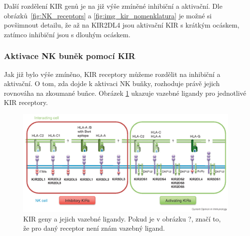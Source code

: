 \documentclass[czech,DP]{thesiskiv}
\numberwithin{equation}{section}
\begin{document}
\noindent
Další rozdělení KIR genů je na již výše zmíněné inhibiční a aktivační. Dle obrázků~\ref{fig:NK_receptors} a  \ref{fig:img_kir_nomenklatura} je možné si povšimnout detailu, že až na KIR2DL4 jsou aktivační KIR s krátkým ocáskem, zatímco inhibiční jsou s dlouhým ocáskem. 

\subsubsection{Aktivace NK buněk pomocí KIR}
Jak již bylo výše zmíněno, KIR receptory můžeme rozdělit na inhibiční a aktivační. O tom, zda dojde k aktivaci NK buňky, rozhoduje právě jejich rovnováha na zkoumané buňce. Obrázek \ref{fig:img_kir_ligand} ukazuje vazebné ligandy pro jednotlivé KIR receptory.  

\begin{figure}[H]		
		\centering
		\includegraphics[width=\textwidth]{./img/KIR_nomenklatura2.png}
		\caption{KIR geny a jejich vazebné ligandy. Pokud je v obrázku ?, značí to, že pro daný receptor není znám vazebný ligand. \cite{KIR_img_nomenklatura}}
		\label{fig:img_kir_ligand}
\end{figure}
\end{document}
